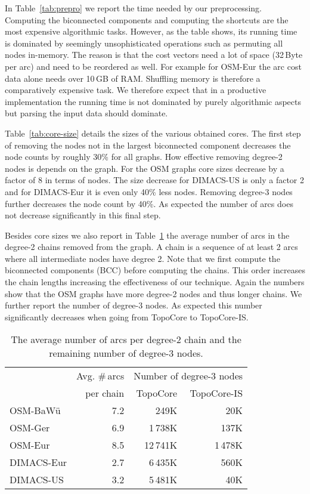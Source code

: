 \documentclass{sig-alternate}
\begin{document}
In Table~\ref{tab:prepro} we report the time needed by our preprocessing.
Computing the biconnected components and computing the shortcuts are
the most expensive algorithmic tasks. However, as the table shows,
its running time is dominated by seemingly unsophisticated operations
such as permuting all nodes in-memory. The reason is that the cost
vectors need a lot of space (32\,Byte per arc) and need to be reordered
as well. For example for OSM-Eur the arc cost data alone needs over
10\,GB of RAM. Shuffling memory is therefore a comparatively
expensive task. We therefore expect that in a productive implementation
the running time is not dominated by purely algorithmic aspects but parsing the input data should dominate.

Table~\ref{tab:core-size} details the sizes of the various obtained cores.
The first step of removing the nodes not in the largest biconnected
component decreases the node counts by roughly 30\% for all graphs.
How effective removing degree-2 nodes is depends on the graph. For
the OSM graphs core sizes decrease by a factor of 8 in terms of nodes.
The size decrease for DIMACS-US is only a factor 2 and for DIMACS-Eur
it is even only 40\% less nodes. Removing degree-3 nodes further decreases
the node count by 40\%. As expected the number of arcs does not decrease significantly in this final step.

Besides core sizes we also report in Table~\ref{tab:chain} the average
number of arcs in the degree-2 chains removed from the graph. A chain
is a sequence of at least 2 arcs where all intermediate nodes have
degree 2. Note that we first compute the biconnected components (BCC) before computing the
chains. This order increases the chain lengths increasing the effectiveness
of our technique. Again the numbers show that the OSM graphs have
more degree-2 nodes and thus longer chains. We further report the
number of degree-3 nodes. As expected this number significantly decreases
when going from TopoCore to TopoCore-IS.

\begin{table}
\caption{\label{tab:chain}The average number of arcs per degree-2 chain and
the remaining number of degree-3 nodes.}
\begin{centering}
\begin{tabular}{lrrr}
\toprule
 & Avg. \#\,arcs  & \multicolumn{2}{c}{Number of degree-3 nodes}\tabularnewline
 & per chain & TopoCore & TopoCore-IS\tabularnewline
\midrule 
OSM-BaWü & 7.2 & 249K & 20K\tabularnewline
OSM-Ger & 6.9 & 1\,738K & 137K\tabularnewline
OSM-Eur & 8.5 & 12\,741K & 1\,478K\tabularnewline
DIMACS-Eur & 2.7 & 6\,435K & 560K\tabularnewline
DIMACS-US & 3.2 & 5\,481K & 40K\tabularnewline
\bottomrule
\end{tabular}
\par\end{centering}
\end{table}
\end{document}
